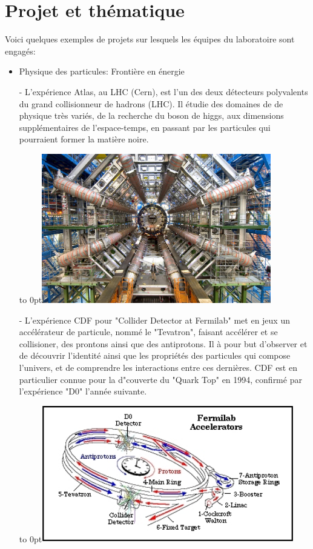 \documentclass[french,a4paper,12pt]{report}
\begin{document}
  \section{Projet et thématique}
  Voici quelques exemples de projets sur lesquels les équipes du laboratoire sont engagés:
  \begin{itemize}
  \item Physique des particules: Frontière en énergie
  
  	- L'expérience Atlas, au LHC (Cern), est l'un des deux détecteurs polyvalents du grand collisionneur de hadrons (LHC). Il étudie des domaines de de physique très variés, de la recherche du boson de higgs, aux dimensions supplémentaires de l'espace-temps, en passant par les particules qui pourraient former la matière noire.\newline
  	
  	\hfill\hbox to 0pt{\hss\includegraphics[width=10cm]{ATLASLHC.jpg}\hss}\hfill\null\newline
 	
 	- L'expérience CDF pour "Collider Detector at Fermilab" met en jeux un accélérateur de particule, nommé le "Tevatron", faisant accélérer et se collisioner, des prontons ainsi que des antiprotons. 	Il à pour but d'observer et de découvrir l'identité ainsi que les propriétés des particules qui compose l'univers, et de comprendre les interactions entre ces dernières.
 	CDF est en particulier connue pour la d"couverte du "Quark Top" en 1994, confirmé par l'expérience "D0" l'année suivante.\newline
 	
 	\hfill\hbox to 0pt{\hss\includegraphics[width=11cm]{D0.jpg}\hss}\hfill\null\newline
 	

\end{itemize}
\end{document}
